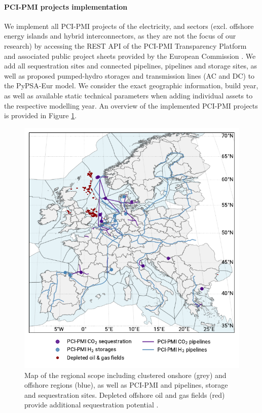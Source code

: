 \documentclass[preprint,12pt,sort&compress]{elsarticle}
\begin{document}
\paragraph{PCI-PMI projects implementation}
\label{sec:pci-pmi_projects_implementation}

We implement all PCI-PMI projects of the electricity,  and  sectors (excl. offshore energy islands and hybrid interconnectors, as they are not the focus of our research) by accessing the REST API of the PCI-PMI Transparency Platform and associated public project sheets provided by the European Commission \cite{europeancommissionPCIPMITransparencyPlatform2024}. We add all  sequestration sites and connected pipelines,  pipelines and storage sites, as well as proposed pumped-hydro storages and transmission lines (AC and DC) to the PyPSA-Eur model. We consider the exact geographic information, build year, as well as available static technical parameters when adding individual assets to the respective modelling year. An overview of the implemented PCI-PMI projects is provided in Figure \ref{fig:regional_scope_map}.
\begin{figure}[htbp]
  \centering
  \includegraphics[width=0.8\linewidth]{map_adm_pcipmi}
  \caption{Map of the regional scope including clustered onshore (grey) and offshore regions (blue), as well as PCI-PMI  and  pipelines, storage and sequestration sites. Depleted offshore oil and gas fields (red) provide additional  sequestration potential \cite{hofmannH2CO2Network2025}.}
  \label{fig:regional_scope_map}
\end{figure}
\end{document}

